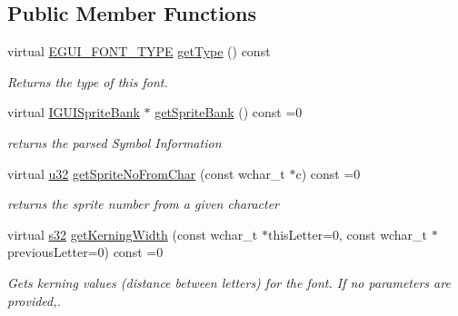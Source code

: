 \subsection*{Public Member Functions}
\begin{DoxyCompactItemize}
\item 
\mbox{\label{classirr_1_1gui_1_1IGUIFontBitmap_a8e4b5d7d84a71fcfcf3cbb96663be332}} 
virtual \hyperlink{namespaceirr_1_1gui_a3c818a164486f43300260327c5420a2f}{E\+G\+U\+I\+\_\+\+F\+O\+N\+T\+\_\+\+T\+Y\+PE} \hyperlink{classirr_1_1gui_1_1IGUIFontBitmap_a8e4b5d7d84a71fcfcf3cbb96663be332}{get\+Type} () const
\begin{DoxyCompactList}\small\item\em Returns the type of this font. \end{DoxyCompactList}\item 
\mbox{\label{classirr_1_1gui_1_1IGUIFontBitmap_ab9185a0c2e708958a8caae7bdeba9deb}} 
virtual \hyperlink{classirr_1_1gui_1_1IGUISpriteBank}{I\+G\+U\+I\+Sprite\+Bank} $\ast$ \hyperlink{classirr_1_1gui_1_1IGUIFontBitmap_ab9185a0c2e708958a8caae7bdeba9deb}{get\+Sprite\+Bank} () const =0
\begin{DoxyCompactList}\small\item\em returns the parsed Symbol Information \end{DoxyCompactList}\item 
\mbox{\label{classirr_1_1gui_1_1IGUIFontBitmap_a3c717559574dd9e63b3d5869c9ee321d}} 
virtual \hyperlink{namespaceirr_a0416a53257075833e7002efd0a18e804}{u32} \hyperlink{classirr_1_1gui_1_1IGUIFontBitmap_a3c717559574dd9e63b3d5869c9ee321d}{get\+Sprite\+No\+From\+Char} (const wchar\+\_\+t $\ast$c) const =0
\begin{DoxyCompactList}\small\item\em returns the sprite number from a given character \end{DoxyCompactList}\item 
virtual \hyperlink{namespaceirr_ac66849b7a6ed16e30ebede579f9b47c6}{s32} \hyperlink{classirr_1_1gui_1_1IGUIFontBitmap_a7bdeaea45745a10e09f7769ec3b95a12}{get\+Kerning\+Width} (const wchar\+\_\+t $\ast$this\+Letter=0, const wchar\+\_\+t $\ast$previous\+Letter=0) const =0
\begin{DoxyCompactList}\small\item\em Gets kerning values (distance between letters) for the font. If no parameters are provided,. \end{DoxyCompactList}\end{DoxyCompactItemize}
